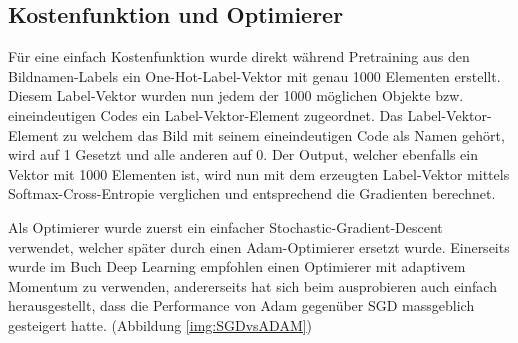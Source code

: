 \subsection{Kostenfunktion und Optimierer}
Für eine einfach Kostenfunktion wurde direkt während Pretraining aus den Bildnamen-Labels ein One-Hot-Label-Vektor mit genau 1000 Elementen erstellt.
Diesem Label-Vektor wurden nun jedem der 1000 möglichen Objekte bzw. eineindeutigen Codes ein Label-Vektor-Element zugeordnet. 
Das Label-Vektor-Element zu welchem das Bild mit seinem eineindeutigen Code als Namen gehört, wird auf 1 Gesetzt und alle anderen auf 0.
Der Output, welcher ebenfalls ein Vektor mit 1000 Elementen ist, wird nun mit dem erzeugten Label-Vektor mittels Softmax-Cross-Entropie verglichen und entsprechend die Gradienten berechnet. 

Als Optimierer wurde zuerst ein einfacher Stochastic-Gradient-Descent verwendet, welcher später durch einen Adam-Optimierer ersetzt wurde. 
Einerseits wurde im Buch Deep Learning \cite{deeplearning} empfohlen einen Optimierer mit adaptivem Momentum zu verwenden, andererseits hat sich beim ausprobieren auch einfach herausgestellt, dass die Performance von Adam gegenüber SGD massgeblich gesteigert hatte. (Abbildung \ref{img:SGDvsADAM})

